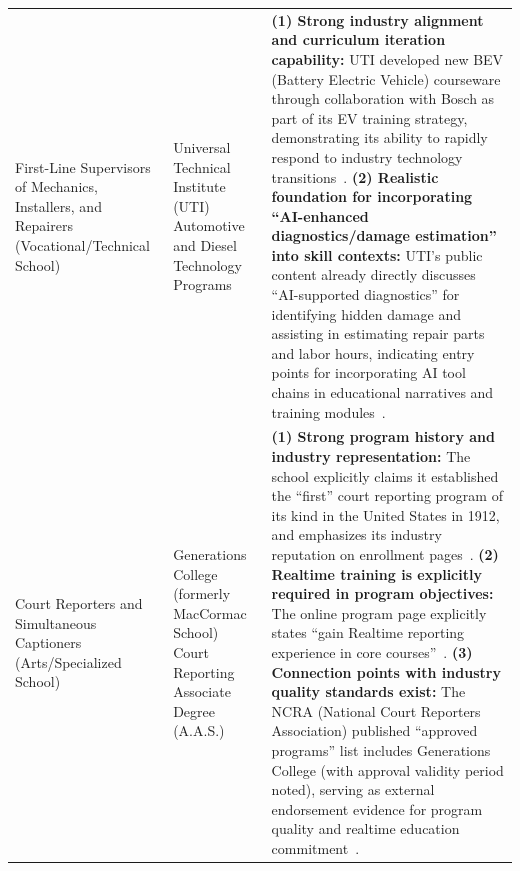 \begin{appendices}
\begin{table}[H]
\begin{tabular}{@{}p{}p{}p{}@{}}
First-Line Supervisors of Mechanics, Installers, and Repairers \newline(Vocational/Technical School) &
Universal Technical Institute (UTI)\newline
Automotive and Diesel Technology Programs &
\textbf{(1) Strong industry alignment and curriculum iteration capability:} UTI developed new BEV (Battery Electric Vehicle) courseware through collaboration with Bosch as part of its EV training strategy, demonstrating its ability to rapidly respond to industry technology transitions~\cite{uti_bosch_2022}.\newline
\textbf{(2) Realistic foundation for incorporating ``AI-enhanced diagnostics/damage estimation'' into skill contexts:} UTI's public content already directly discusses ``AI-supported diagnostics'' for identifying hidden damage and assisting in estimating repair parts and labor hours, indicating entry points for incorporating AI tool chains in educational narratives and training modules~\cite{uti_collision_ai_2026}. \\
\addlinespace

Court Reporters and Simultaneous Captioners \newline(Arts/Specialized School) &
Generations College (formerly MacCormac School)\newline
Court Reporting Associate Degree (A.A.S.) &
\textbf{(1) Strong program history and industry representation:} The school explicitly claims it established the ``first'' court reporting program of its kind in the United States in 1912, and emphasizes its industry reputation on enrollment pages~\cite{generations_court_2026}.\newline
\textbf{(2) Realtime training is explicitly required in program objectives:} The online program page explicitly states ``gain Realtime reporting experience in core courses''~\cite{generations_online_2026}.\newline
\textbf{(3) Connection points with industry quality standards exist:} The NCRA (National Court Reporters Association) published ``approved programs'' list includes Generations College (with approval validity period noted), serving as external endorsement evidence for program quality and realtime education commitment~\cite{ncra_approved_2026}. \\
\bottomrule
\end{tabular}
\end{table}

\end{appendices}
